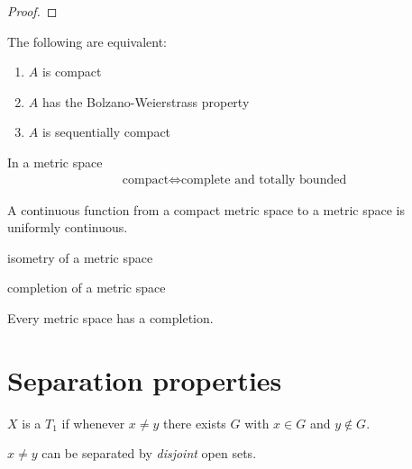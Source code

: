 \begin{proof}
\end{proof}

\begin{definition}

\end{definition}

\begin{theorem}[20.21]
  The following are equivalent:
  \begin{enumerate}
  \item $A$ is compact
  \item $A$ has the Bolzano-Weierstrass property
  \item $A$ is sequentially compact
  \end{enumerate}
\end{theorem}

\begin{definition}

\end{definition}

\begin{theorem}[20.23]
  In a metric space
  \begin{align*}
    \text{compact} \iff \text{complete and totally bounded}
  \end{align*}

\end{theorem}


\begin{theorem*}
  A continuous function from a compact metric space to a metric space is uniformly continuous.
\end{theorem*}


\begin{definition*}
  isometry of a metric space

  completion of a metric space
\end{definition*}

\begin{theorem*}
  Every metric space has a completion.
\end{theorem*}

\section*{Separation properties}

\begin{definition*}

  $X$ is a $T_1$  if whenever $x \neq y$ there exists $G$ with $x \in G$ and $y \notin G$.

   $x \neq y$ can be separated by {\it disjoint} open sets.


\end{definition*}

